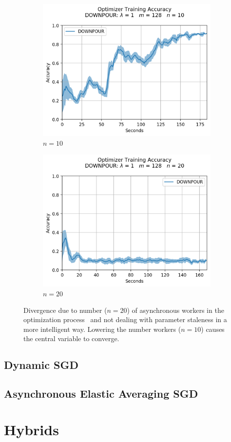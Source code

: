 \begin{figure}[H]
  \centering
  \begin{subfigure}{.49\textwidth}
    \centering
    \includegraphics[width=\linewidth]{resources/images/downpour_10}
    \caption{$n = 10$}
  \end{subfigure}
  \begin{subfigure}{.49\textwidth}
    \centering
    \includegraphics[width=\linewidth]{resources/images/downpour_20}
    \caption{$n = 20$}
  \end{subfigure}
  \caption{Divergence due to number ($n = 20$) of asynchronous workers in the optimization process~\cite{implicitmomentum} and not dealing with parameter staleness in a more intelligent way. Lowering the number workers ($n = 10$) causes the central variable to converge.}
  \label{fig:easgd_sync_slow}
\end{figure}


\subsection{Dynamic SGD}
\label{sec:dyn_sgd}

\subsection{Asynchronous Elastic Averaging SGD}
\label{sec:aeasgd}

\section{Hybrids}
\label{sec:hybrids}
